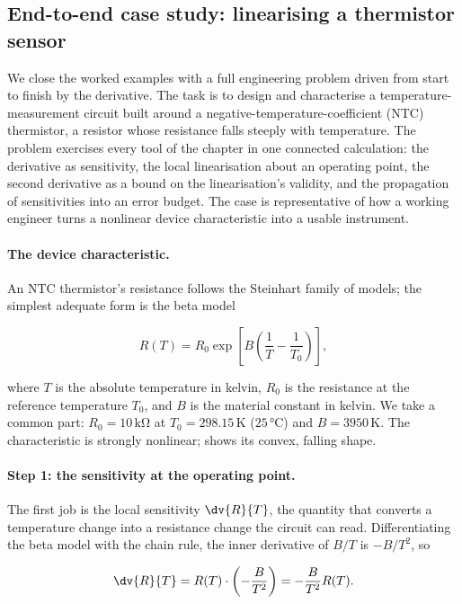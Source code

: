 \subsection{End-to-end case study: linearising a thermistor sensor}

We close the worked examples with a full engineering problem driven
from start to finish by the derivative. The task is to design and
characterise a temperature-measurement circuit built around a
negative-temperature-coefficient (NTC) thermistor, a resistor whose
resistance falls steeply with temperature. The problem exercises
every tool of the chapter in one connected calculation: the
derivative as sensitivity, the local linearisation about an
operating point, the second derivative as a bound on the
linearisation's validity, and the propagation of sensitivities into
an error budget. The case is representative of how a working
engineer turns a nonlinear device characteristic into a usable
instrument.

\paragraph{The device characteristic.}
An NTC thermistor's resistance follows the Steinhart family of
models; the simplest adequate form is the beta model

\[
R(T) = R_{0} \exp\!\left[B\left(\frac{1}{T} - \frac{1}{T_{0}}
\right)\right],
\]

where $T$ is the absolute temperature in kelvin, $R_{0}$ is the
resistance at the reference temperature $T_{0}$, and $B$ is the
material constant in kelvin. We take a common part: $R_{0} =
10\,\si{\kilo\ohm}$ at $T_{0} = 298.15\,\si{\kelvin}$ ($25\,
\si{\degreeCelsius}$) and $B = 3950\,\si{\kelvin}$. The
characteristic is strongly nonlinear; 
shows its convex, falling shape.



\paragraph{Step 1: the sensitivity at the operating point.}
The first job is the local sensitivity $\dv{R}{T}$, the quantity
that converts a temperature change into a resistance change the
circuit can read. Differentiating the beta model with the chain
rule, the inner derivative of $B/T$ is $-B/T^{2}$, so

\[
\dv{R}{T} = R(T) \cdot \left(-\frac{B}{T^{2}}\right) =
-\frac{B}{T^{2}} R(T).
\]

